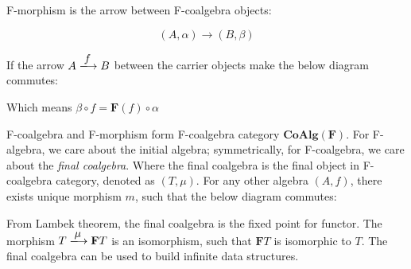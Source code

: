 \documentclass{article}
\begin{document}
\begin{definition}
\normalfont
F-morphism is the arrow between F-coalgebra objects:

\[
  (A, \alpha) \longrightarrow (B, \beta)
\]

If the arrow $A \arrowto{f} B$ between the carrier objects make the below diagram commutes:

\begin{center}
\end{center}

Which means $\beta \circ f = \mathbf{F}(f) \circ \alpha$
\end{definition}

F-coalgebra and F-morphism form F-coalgebra category $\pmb{CoAlg}(\mathbf{F})$. For F-algebra, we care about the initial algebra; symmetrically, for F-coalgebra, we care about the {\em final coalgebra}. Where the final coalgebra is the final object in F-coalgebra category, denoted as $(T, \mu)$. For any other algebra $(A, f)$, there exists unique morphism $m$, such that the below diagram commutes:

\begin{center}
\end{center}

From Lambek theorem, the final coalgebra is the fixed point for functor. The morphism $T \arrowto{\mu} \mathbf{F} T$ is an isomorphism, such that $\mathbf{F} T$ is isomorphic to $T$. The final coalgebra can be used to build infinite data structures.
\end{document}
